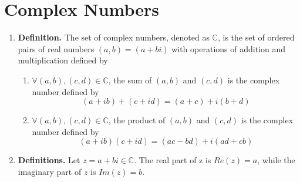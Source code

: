 \documentclass[oneside, 12pt]{book}
\newcommand{\settag}[1]{\renewcommand{\theenumi}{#1}}
\newcommand{\complex}{\mathbb{C}}
\newcommand{\tbf}[1]{\textbf{#1}}
\newcommand{\para}[1]{\item \tbf{#1}}
\begin{document}
\section{Complex Numbers}
\begin{enumerate}
    \settag{5.1.1}
    \para{Definition.} The set of complex numbers, denoted as $\mathbb{C}$, is the set 
    of ordered pairs of real numbers $(a,b) = (a+bi)$ with operations of addition and 
    multiplication defined by
    \begin{enumerate}
        \item $\forall (a,b), (c,d)\in \mathbb{C}$, the sum of $(a,b)$ and $(c,d)$ is 
        the complex number defined by
        \begin{equation*}
            (a+ib) + (c+id) = (a+c)+i(b+d)
        \end{equation*}
        \item $\forall (a,b),(c,d) \in \mathbb{C}$, the product of $(a,b)$ and $(c,d)$ 
        is the complex number defined by
        \begin{equation*}
            (a+ib)(c+id) = (ac-bd)+i(ad+cb)
        \end{equation*}
    \end{enumerate}
    
    \settag{5.1.2}
    \para{Definitions.} Let $z = a+bi \in \complex$. The real part of z is $Re(z) = a$, 
    while the imaginary part of $z$ is $Im(z) = b$.
    

\end{enumerate}
\end{document}
